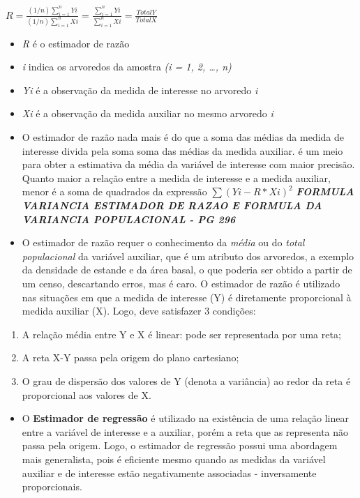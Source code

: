 \documentclass[
]{article}
\providecommand{\tightlist}{%
  \setlength{\itemsep}{0pt}\setlength{\parskip}{0pt}}
\begin{document}
\(R = \frac{ (1/n)\sum^{n}_{i=1} Yi}{ (1/n)\sum^{n}_{i=1} Xi} = \frac{\sum^{n}_{i=1} Yi}{\sum^{n}_{i=1} Xi} = \frac{Total Y}{Total X}\)

\begin{itemize}
\item
  \emph{R} é o estimador de razão
\item
  \emph{i} indica os arvoredos da amostra \emph{(i = 1, 2, \ldots, n)}
\item
  \emph{Yi} é a observação da medida de interesse no arvoredo \emph{i}
\item
  \emph{Xi} é a observação da medida auxiliar no mesmo arvoredo \emph{i}
\item
  O estimador de razão nada mais é do que a soma das médias da medida de
  interesse divida pela soma soma das médias da medida auxiliar. é um
  meio para obter a estimativa da média da variável de interesse com
  maior precisão. Quanto maior a relação entre a medida de interesse e a
  medida auxiliar, menor é a soma de quadrados da expressão
  \(\sum(Yi - R * Xi)^2\) \textbf{\emph{FORMULA VARIANCIA ESTIMADOR DE
  RAZAO E FORMULA DA VARIANCIA POPULACIONAL - PG 296}}
\item
  O estimador de razão requer o conhecimento da \emph{média} ou do
  \emph{total populacional} da variável auxiliar, que é um atributo dos
  arvoredos, a exemplo da densidade de estande e da área basal, o que
  poderia ser obtido a partir de um censo, descartando erros, mas é
  caro. O estimador de razão é utilizado nas situações em que a medida
  de interesse (Y) é diretamente proporcional à medida auxiliar (X).
  Logo, deve satisfazer 3 condições:\\
\end{itemize}

\begin{enumerate}
\def\labelenumi{\arabic{enumi}.}
\tightlist
\item
  A relação média entre Y e X é linear: pode ser representada por uma
  reta;
\item
  A reta X-Y passa pela origem do plano cartesiano;
\item
  O grau de dispersão dos valores de Y (denota a variância) ao redor da
  reta é proporcional aos valores de X.
\end{enumerate}

\begin{itemize}
\tightlist
\item
  O \textbf{Estimador de regressão} é utilizado na existência de uma
  relação linear entre a variável de interesse e a auxiliar, porém a
  reta que as representa não passa pela origem. Logo, o estimador de
  regressão possui uma abordagem mais generalista, pois é eficiente
  mesmo quando as medidas da variável auxiliar e de interesse estão
  negativamente associadas - inversamente proporcionais.
\end{itemize}
\end{document}

